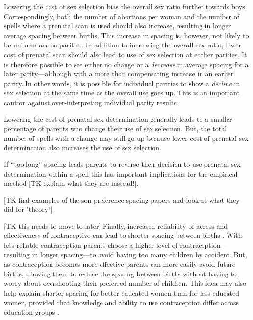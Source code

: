 \documentclass[12pt,letterpaper]{article}
\begin{document}
Lowering the cost of sex selection bias the overall sex ratio further 
towards boys.
Correspondingly, both the number of abortions per woman and the
number of spells where a prenatal scan is used should also increase,
resulting in longer average spacing between births.
This increase in spacing is, however, not likely to be uniform across parities.
In addition to increasing the overall sex ratio, lower cost of prenatal 
scan should also lead to use of sex selection at earlier parities.
It is therefore possible to see either no change or a \emph{decrease} 
in average spacing for a later parity---although with a more than compensating 
increase in an earlier parity.
In other words, it is possible for individual parities to show a \emph{decline}
in sex selection at the same time as the overall use goes up.
This is an important caution against over-interpreting individual 
parity results.


Lowering the cost of prenatal sex determination generally leads to 
a smaller percentage of parents who change their use of sex selection.
But, the total number of spells with a change may still
go up because lower cost of prenatal sex determination also
increases the use of sex selection.



If ``too long'' spacing leads parents to reverse their decision to use
prenatal sex determination within a spell this has important implications 
for the empirical method [TK explain what they are instead!].






[TK find examples of the son preference spacing papers and look at what they did
for "theory"]


[TK this needs to move to later]
Finally, increased reliability of access and effectiveness of
contraceptive can lead to shorter spacing between births 
\citep{Keyfitz1971,Heckman1976}.
With less reliable contraception parents choose a higher level of 
contraception---resulting in longer spacing---to avoid having 
too many children by accident.
But, as contraception becomes more effective parents can more
easily avoid future births, allowing them to reduce the spacing 
between births without having to worry about overshooting their 
preferred number of children.
This idea may also help explain shorter spacing for better 
educated women than for less educated women, provided that   
knowledge and ability to use contraception differ
across education groups \citep{Tulasidhar1993,Whitworth2002}.
\end{document}
